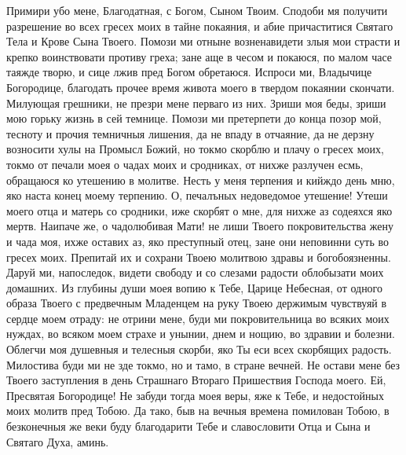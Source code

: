 \begin{mymulticols}
Примири убо мене, Благодатная, с Богом, Сыном Твоим. Сподоби мя получити разрешение во всех гресех моих в тайне покаяния, и абие причаститися Святаго Тела и Крове Сына Твоего. Помози ми отныне возненавидети злыя мои страсти и крепко воинствовати противу греха; зане аще в чесом и покаюся, по малом часе таяжде творю, и сице лжив пред Богом обретаюся. Испроси ми, Владычице Богородице, благодать прочее время живота моего в твердом покаянии скончати. Милующая грешники, не презри мене перваго из них. Зриши моя беды, зриши мою горьку жизнь в сей темнице. Помози ми претерпети до конца позор мой, тесноту и прочия темничныя лишения, да не впаду в отчаяние, да не дерзну возносити хулы на Промысл Божий, но токмо скорблю и плачу о гресех моих, токмо от печали моея о чадах моих и сродниках, от нихже разлучен есмь, обращаюся ко утешению в молитве. Несть у меня терпения и кийждо день мню, яко наста конец моему терпению. О, печалъных недоведомое утешение! Утеши моего отца и матерь со сродники, иже скорбят о мне, для нихже аз содеяхся яко мертв. Наипаче же, о чадолюбивая Мати! не лиши Твоего покровительства жену и чада моя, ихже оставих аз, яко преступный отец, зане они неповинни суть во гресех моих. Препитай их и сохрани Твоею молитвою здравы и богобоязненны. Даруй ми, напоследок, видети свободу и со слезами радости облобызати моих домашних. Из глубины души моея вопию к Тебе, Царице Небесная, от одного образа Твоего с предвечным Младенцем на руку Твоею держимым чувствуяй в сердце моем отраду: не отрини мене, буди ми покровительница во всяких моих нуждах, во всяком моем страхе и унынии, днем и нощию, во здравии и болезни. Облегчи моя душевныя и телесныя скорби, яко Ты еси всех скорбящих радость. Милостива буди ми не зде токмо, но и тамо, в стране вечней. Не остави мене без Твоего заступления в день Страшнаго Втораго Пришествия Господа моего. Ей, Пресвятая Богородице! Не забуди тогда моея веры, яже к Тебе, и недостойных моих молитв пред Тобою. Да тако, быв на вечныя времена помилован Тобою, в безконечныя же веки буду благодарити Тебе и славословити Отца и Сына и Святаго Духа, аминь. 

\end{mymulticols}

\mychapterending



{\centering{}

}

